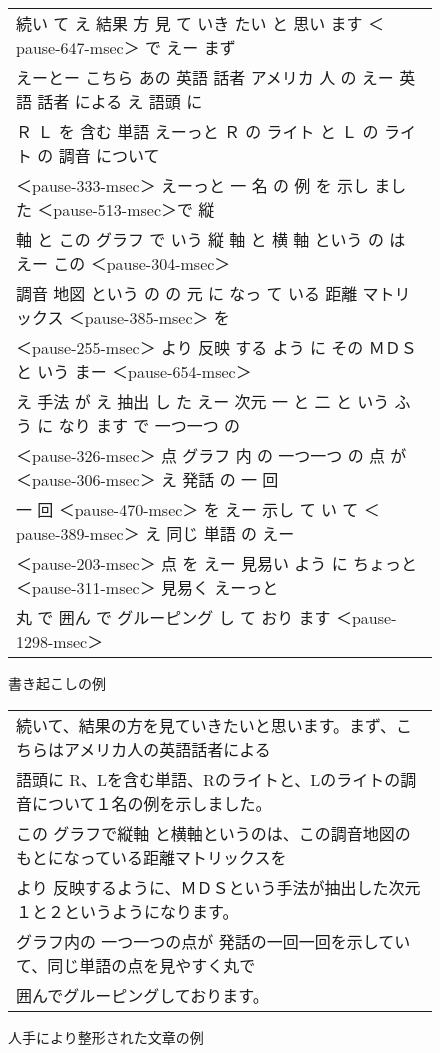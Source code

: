\begin{figure}[t]
\small
\begin{center}
\begin{tabular}{l}
\hline
続い て え 結果 方 見 て いき たい と 思い ます ＜pause-647-msec＞ で えー まず \\
えーとー こちら あの 英語 話者 アメリカ 人 の えー 英語 話者 による え 語頭 に \\
Ｒ Ｌ を 含む 単語 えーっと Ｒ の ライト と Ｌ の ライト の 調音 について \\
＜pause-333-msec＞ えーっと 一 名 の 例 を 示し まし た ＜pause-513-msec＞で 縦 \\
軸 と この グラフ で いう 縦 軸 と 横 軸 という の は えー この ＜pause-304-msec＞ \\
調音 地図 という の の 元 に なっ て いる 距離 マトリックス ＜pause-385-msec＞ を \\
＜pause-255-msec＞ より 反映 する よう に その ＭＤＳ と いう まー ＜pause-654-msec＞ \\
え 手法 が え 抽出 し た えー 次元 一 と 二 と いう ふう に なり ます で 一つ一つ の \\
＜pause-326-msec＞ 点 グラフ 内 の 一つ一つ の 点 が ＜pause-306-msec＞ え 発話 の 一 回 \\
一 回 ＜pause-470-msec＞ を えー 示し て い て ＜pause-389-msec＞ え 同じ 単語 の えー \\
＜pause-203-msec＞ 点 を えー 見易い よう に ちょっと ＜pause-311-msec＞ 見易く えーっと \\
丸 で 囲ん で グルーピング し て おり ます ＜pause-1298-msec＞ \\
\hline
\end{tabular}
\caption{書き起こしの例}
\label{kakiokosi}
\end{center}
\vspace{-1.0mm}
\end{figure}

\begin{figure}[t]
\small
\begin{center}
\begin{tabular}{l}
\hline
続いて、結果の方を見ていきたいと思います。まず、こちらはアメリカ人の英語話者による \\
語頭に R、Lを含む単語、Rのライトと、Lのライトの調音について１名の例を示しました。\\
この グラフで縦軸 と横軸というのは、この調音地図のもとになっている距離マトリックスを \\
 より 反映するように、ＭＤＳという手法が抽出した次元１と２というようになります。\\
グラフ内の 一つ一つの点が 発話の一回一回を示していて、同じ単語の点を見やすく丸で \\
囲んでグルーピングしております。\\
\hline
\end{tabular}
\caption{人手により整形された文章の例}
\label{kouenroku}
\end{center}
\vspace{-1.0mm}
\end{figure}


